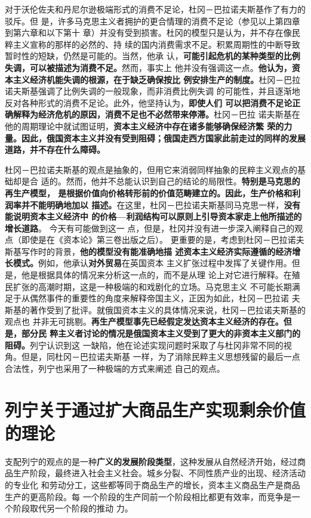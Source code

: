 对于沃伦佐夫和丹尼尔逊极端形式的消费不足论，杜冈－巴拉诺夫斯基作了有力的驳斥。但
是，许多马克思主义者拥护的更合情理的消费不足论（参见以上第四章到第六章和以下第十
章）并没有受到损害。杜冈的模型只是认为，并不存在像民粹主义宣称的那样的必然的、持
续的国内消费需求不足。积累周期性的中断导致暂时性的短缺，仍然是可能的。当然，他承
认，\textbf{可能引起危机的某种类型的比例失调，可以被描述为消费不足。}然而，事实上
他并没有强调这一点。\textbf{他认为，资本主义经济机能失调的根源，在于缺乏确保按比
  例安排生产的制度。}杜冈－巴拉诺夫斯基强调了比例失调的一般现象，而非消费比例失调
的可能性，并且逐渐地反对各种形式的消费不足论。此外，他坚持认为，\textbf{即使人们
  可以把消费不足论正确解释为经济危机的原因，消费不足也不必然带来停滞。}杜冈－巴拉
诺夫斯基在他的周期理论中就试图证明，\textbf{资本主义经济中存在诸多能够确保经济繁
  荣的力量。因此，俄国资本主义并没有受到阻碍；俄国走西方国家此前走过的同样的发展
  道路，并不存在什么障碍。}

杜冈－巴拉诺夫斯基的观点是抽象的，但用它来消弱同样抽象的民粹主义观点的基础却是合
适的。然而，他并不总能认识到自己的结论的局限性。\textbf{特别是马克思的再生产模型，
  是根据价值向价格转形前的价值范畴建立的。因此，生产价格和利润率并不能明确地加以
  描述。}在这里，杜冈－巴拉诺夫斯基同马克思一样，\textbf{没有能说明资本主义经济中
  的价格—利润结构可以原则上引导资本家走上他所描述的增长道路}。 今天有可能做到这一
点，但是，杜冈并没有进一步深入阐释自己的观点（即使是在《资本论》第三卷出版之后）。
更重要的是，考虑到杜冈－巴拉诺夫斯基写作时的背景，\textbf{他的模型没有能准确地描
  述资本主义经济实际遵循的经济增长模式。}例如，他承认\textbf{对外贸易}在英国资本
主义扩张过程中发挥了关键作用。但是，他是根据具体的情况来分析这一点的，而不是从理
论上对它进行解释。在殖民扩张的高潮时期，这是一种极端的和戏剧化的立场。马克思主义
不可能长期满足于从偶然事件的重要性的角度来解释帝国主义，正因为如此，杜冈－巴拉诺
夫斯基的著作受到了批评。就俄国资本主义的具体情况来说，杜冈－巴拉诺夫斯基的观点也
并非无可挑剔。\textbf{再生产模型事先已经假定发达资本主义经济的存在。但是，部分民
  粹主义者讨论的情况是俄国资本主义受到了更大的非资本主义部门的阻碍。}列宁认识到这
一缺陷，他在论述实现问题时采取了与杜冈非常不同的视角。但是，同杜冈－巴拉诺夫斯基
一样，为了消除民粹主义思想残留的最后一点合法性，列宁也采用了一种极端的方式来阐述
自己的观点。

\section{列宁关于通过扩大商品生产实现剩余价值的理论}

支配列宁的观点的是一种\textbf{广义的发展阶段类型}，这种发展从自然经济开始，经过商
品生产阶段，最终进入社会主义社会。城乡分裂、不同性质产业的出现、经济活动的专业化
和劳动分工，这些都等同于商品生产的增长，资本主义商品生产是商品生产的更高阶段。每
一个阶段的生产同前一个阶段相比都更有效率，而竞争是一个阶段取代另一个阶段的推动
力。

